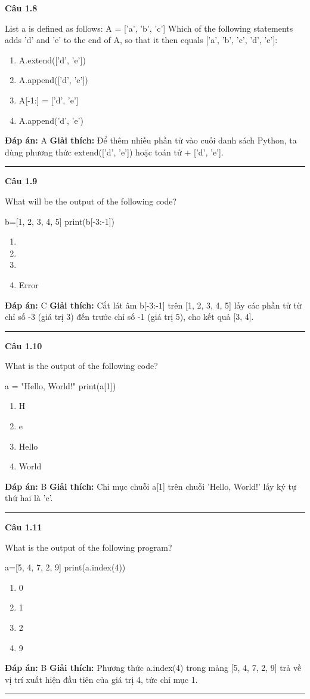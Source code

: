 \documentclass[11pt,a4paper]{article}
\newenvironment{question}[1]{%
  \par\vspace{1em}\noindent\textbf{\large Câu #1}\par\vspace{0.4em}
}{%
  \par\vspace{1em}\hrule\vspace{0.6em}
}
\newenvironment{choices}{%
  \begin{enumerate}[label=\textbf{\Alph*.},leftmargin=2.2em,itemsep=2pt,topsep=3pt]
}{%
  \end{enumerate}
}
\newcommand{\choice}{\item}
\newenvironment{codebox}{%
  \begin{tcolorbox}[colback=gray!8!white,colframe=gray!50!black,arc=1.5mm,boxrule=0.6pt,left=3mm,right=3mm,top=2.5mm,bottom=2.5mm]
  \ttfamily\small
}{%
  \end{tcolorbox}
}
\begin{document}
\begin{question}{1.8}
List a is defined as follows: A = ['a', 'b', 'c'] Which of the following statements adds 'd' and 'e' to the end of A, so that it then equals ['a', 'b', 'c', 'd', 'e']:
\begin{choices}
\choice A.extend(['d', 'e'])
\choice A.append(['d', 'e'])
\choice A[-1:] = ['d', 'e']
\choice A.append('d', 'e')
\end{choices}
\textbf{Đáp án:} A
\textbf{Giải thích:} Để thêm nhiều phần tử vào cuối danh sách Python, ta dùng phương thức extend(['d', 'e']) hoặc toán tử + ['d', 'e'].
\end{question}

\begin{question}{1.9}
What will be the output of the following code?
\begin{codebox}
b=[1, 2, 3, 4, 5]
print(b[-3:-1])
\end{codebox}
\begin{choices}
\choice [1]
\choice [2, 3]
\choice [3, 4]
\choice Error
\end{choices}
\textbf{Đáp án:} C
\textbf{Giải thích:} Cắt lát âm b[-3:-1] trên [1, 2, 3, 4, 5] lấy các phần tử từ chỉ số -3 (giá trị 3) đến trước chỉ số -1 (giá trị 5), cho kết quả [3, 4].
\end{question}

\begin{question}{1.10}
What is the output of the following code?
\begin{codebox}
a = "Hello, World!"
print(a[1])
\end{codebox}
\begin{choices}
\choice H
\choice e
\choice Hello
\choice World
\end{choices}
\textbf{Đáp án:} B
\textbf{Giải thích:} Chỉ mục chuỗi a[1] trên chuỗi 'Hello, World!' lấy ký tự thứ hai là 'e'.
\end{question}

\begin{question}{1.11}
What is the output of the following program?
\begin{codebox}
a=[5, 4, 7, 2, 9]
print(a.index(4))
\end{codebox}
\begin{choices}
\choice 0
\choice 1
\choice 2
\choice 9
\end{choices}
\textbf{Đáp án:} B
\textbf{Giải thích:} Phương thức a.index(4) trong mảng [5, 4, 7, 2, 9] trả về vị trí xuất hiện đầu tiên của giá trị 4, tức chỉ mục 1.
\end{question}
\end{document}
